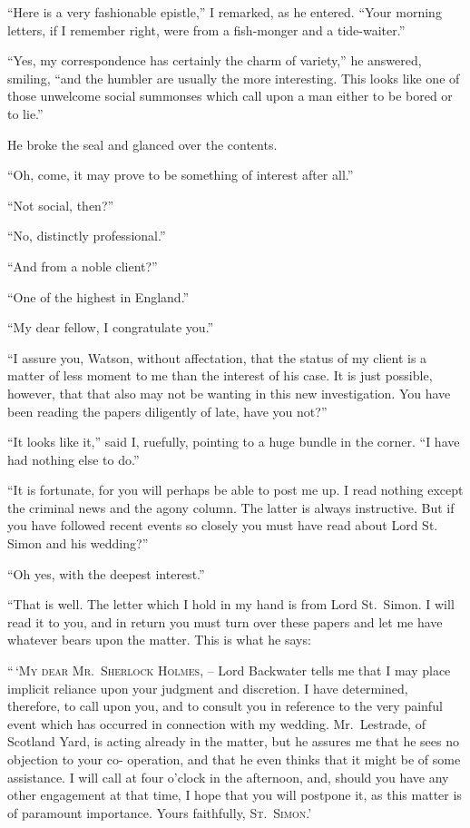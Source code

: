 “Here is a very fashionable epistle,” I remarked, as he
entered. “Your morning letters, if I remember right, were
from a fish-monger and a tide-waiter.”

“Yes, my correspondence has certainly the charm of variety,”
he answered, smiling, “and the humbler are usually
the more interesting. This looks like one of those unwelcome
social summonses which call upon a man either to be
bored or to lie.”

He broke the seal and glanced over the contents.

“Oh, come, it may prove to be something of interest after
all.”

“Not social, then?”

“No, distinctly professional.”

“And from a noble client?”

“One of the highest in England.”

“My dear fellow, I congratulate you.”

“I assure you, Watson, without affectation, that the status
of my client is a matter of less moment to me than the interest
of his case. It is just possible, however, that that also
may not be wanting in this new investigation. You have
been reading the papers diligently of late, have you not?”

“It looks like it,” said I, ruefully, pointing to a huge bundle
in the corner. “I have had nothing else to do.”

“It is fortunate, for you will perhaps be able to post me up.
I read nothing except the criminal news and the agony column.
The latter is always instructive. But if you have followed
recent events so closely you must have read about Lord St.\ %
Simon and his wedding?”

“Oh yes, with the deepest interest.”

“That is well. The letter which I hold in my hand is
from Lord St.~Simon. I will read it to you, and in return
you must turn over these papers and let me have whatever
bears upon the matter. This is what he says:

\begin{letter}
“\,‘\textsc{My dear Mr.~Sherlock Holmes}, -- Lord Backwater
tells me that I may place implicit reliance upon your judgment
and discretion. I have determined, therefore, to call
upon you, and to consult you in reference to the very painful
event which has occurred in connection with my wedding.
Mr.~Lestrade, of Scotland Yard, is acting already in the matter,
but he assures me that he sees no objection to your co-%
operation, and that he even thinks that it might be of some
assistance. I will call at four o’clock in the afternoon, and,
should you have any other engagement at that time, I hope
that you will postpone it, as this matter is of paramount
importance. Yours faithfully, \textsc{St.~Simon}.’
\end{letter}

